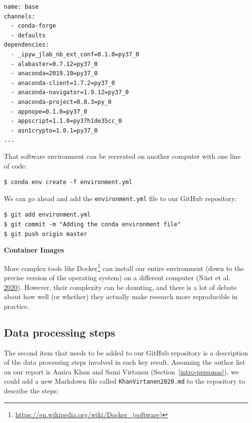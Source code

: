 \documentclass[
]{krantz}
\renewenvironment{quote}{\begin{VF}}{\end{VF}}
\renewcommand{\href}[2]{#2\footnote{\url{#1}}}
\begin{document}
\begin{verbatim}
name: base
channels:
  - conda-forge
  - defaults
dependencies:
  - _ipyw_jlab_nb_ext_conf=0.1.0=py37_0
  - alabaster=0.7.12=py37_0
  - anaconda=2019.10=py37_0
  - anaconda-client=1.7.2=py37_0
  - anaconda-navigator=1.9.12=py37_0
  - anaconda-project=0.8.3=py_0
  - appnope=0.1.0=py37_0
  - appscript=1.1.0=py37h1de35cc_0
  - asn1crypto=1.0.1=py37_0
...
\end{verbatim}

That software environment can be recreated on another computer with one line of code:

\begin{verbatim}
$ conda env create -f environment.yml
\end{verbatim}

We can go ahead and add the \texttt{environment.yml} file to our GitHub repository:

\begin{verbatim}
$ git add environment.yml
$ git commit -m "Adding the conda environment file"
$ git push origin master
\end{verbatim}

\begin{quote}
\textbf{Container Images}

More complex tools like \href{https://en.wikipedia.org/wiki/Docker_(software)}{Docker}
can install our entire environment
(down to the precise version of the operating system)
on a different computer (Nüst et al. \protect\hyperlink{ref-Nust2020}{2020}).
However,
their complexity can be daunting,
and there is a lot of debate
about how well (or whether) they actually make research more reproducible in practice.
\end{quote}

\hypertarget{provenance-code-steps}{%
\subsection{Data processing steps}\label{provenance-code-steps}}

The second item that needs to be added to our GitHub repository is a description
of the data processing steps involved in each key result.
Assuming the author list on our report is Amira Khan and Sami Virtanen (Section~\ref{intro-personas}),
we could add a new Markdown file called \texttt{KhanVirtanen2020.md} to the repository
to describe the steps:
\end{document}
